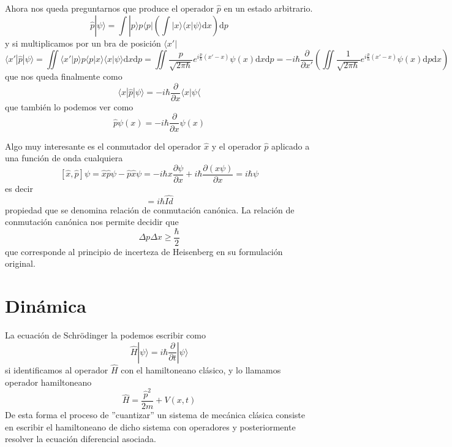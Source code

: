 \documentclass{book}
\numberwithin{equation}{section} %
\begin{document}
Ahora nos queda preguntarnos que produce el operador $\hat{p}$ en un estado arbitrario.
\[ \hat{p}|\psi\rangle = \int |p\rangle p \langle p|\left(\int | x \rangle \langle x |\psi \rangle \mathrm{d}x \right) \mathrm{d}p \]
y si multiplicamos por un bra de posición $\langle x'|$
\[ \langle x' | \hat{p} | \psi \rangle = \iint \langle x'|p\rangle p \langle p | x \rangle \langle x | \psi \rangle \mathrm{d}x\mathrm{d}p = \iint \frac{p}{\sqrt{2\pi\hbar}} e^{i \frac{p}{\hbar} (x' - x)} \psi(x) \mathrm{d}x \mathrm{d}p = -i \hbar \frac{\partial}{\partial x'} \left(\iint \frac{1}{\sqrt{2\pi\hbar}} e^{i \frac{p}{\hbar} (x' - x)} \psi(x) \mathrm{d}p \mathrm{d}x \right)\]
que nos queda finalmente como
\begin{equation}
\langle x | \hat{p} | \psi \rangle = - i \hbar \frac{\partial}{\partial x} \langle x | \psi\langle
\label{eq:operador_p_estado}
\end{equation}
que también lo podemos ver como
\begin{equation}
 \hat{p} \psi(x) = - i \hbar \frac{\partial}{\partial x} \psi(x)
\end{equation}

Algo muy interesante es el conmutador del operador $\hat{x}$ y el operador $\hat{p}$ aplicado a una función de onda cualquiera
\[[\hat{x},\hat{p}]\psi = \hat{x}\hat{p}\psi - \hat{p}\hat{x}\psi = -i \hbar x \frac{\partial \psi}{\partial x} + i \hbar \frac{\partial (x \psi)}{\partial x} = i \hbar \psi \]
es decir 
\begin{equation}
[\hat{x},\hat{p}] = i \hbar \hat{Id}
\end{equation}
propiedad que se denomina relación de conmutación canónica. 
La relación de conmutación canónica nos permite decidir que
\begin{equation}
\Delta p \Delta x \geq \frac{\hbar}{2}
\end{equation}
que corresponde al principio de incerteza de Heisenberg en su formulación original.

\section{Dinámica}

La ecuación de Schrödinger la podemos escribir como
\begin{equation}
  \hat{H} |\psi\rangle = i \hbar \frac{\partial}{\partial t} |\psi\rangle
\end{equation}
si identificamos al operador $\hat{H}$ con el hamiltoneano clásico, y lo llamamos operador hamiltoneano
\begin{equation}
\hat{H} = \frac{\hat{p}^2}{2m} + V(x, t)
\end{equation}
De esta forma el proceso de ''cuantizar'' un sistema de mecánica clásica consiste en escribir el hamiltoneano de dicho sistema con operadores y posteriormente resolver la ecuación diferencial asociada.
\end{document}
